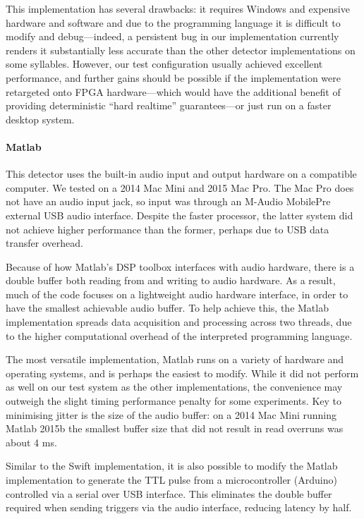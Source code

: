 \documentclass[10pt,letterpaper]{article}
\renewcommand{\subsubsection}[1]{\paragraph{#1}}
\begin{document}
This implementation has several drawbacks: it requires Windows and expensive hardware and software and due to the programming language it is difficult to modify and debug---indeed, a persistent bug in our implementation currently renders it substantially less accurate than the other detector implementations on some syllables. However, our test configuration usually achieved excellent performance, and further gains should be possible if the implementation were retargeted onto FPGA hardware---which would have the additional benefit of providing deterministic ``hard realtime'' guarantees---or just run on a faster desktop system.

\subsubsection{Matlab}

This detector uses the built-in audio input and output hardware on a compatible computer.  We tested on a 2014 Mac Mini and 2015 Mac Pro.  The Mac Pro does not have an audio input jack, so input was through an M-Audio MobilePre external USB audio interface.  Despite the faster processor, the latter system did not achieve higher performance than the former, perhaps due to USB data transfer overhead.

Because of how Matlab's DSP toolbox interfaces with audio hardware, there is a double buffer both reading from and writing to audio hardware. As a result, much of the code focuses on a lightweight audio hardware interface, in order to have the smallest achievable audio buffer. To help achieve this, the Matlab implementation spreads data acquisition and processing across two threads, due to the higher computational overhead of the interpreted programming language.

The most versatile implementation, Matlab runs on a variety of hardware and operating systems, and is perhaps the easiest to modify.  While it did not perform as well on our test system as the other implementations, the convenience may outweigh the slight timing performance penalty for some experiments.  Key to minimising jitter is the size of the audio buffer: on a 2014 Mac Mini running Matlab 2015b the smallest buffer size that did not result in read overruns was about 4 ms.

Similar to the Swift implementation, it is also possible to modify the Matlab implementation to generate the TTL pulse from a microcontroller (Arduino) controlled via a serial over USB interface. This eliminates the double buffer required when sending triggers via the audio interface, reducing latency by half.
\end{document}
